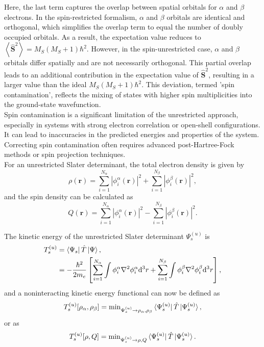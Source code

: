 \documentclass[%
 preprint, linenumbers,
 amsmath,amssymb,
 aps, physrev,
]{revtex4-2}
\begin{document}
Here, the last term captures the overlap between spatial orbitals for $\alpha$ and $\beta$ electrons. In the spin-restricted formalism, $\alpha$ and $\beta$ orbitals are identical and orthogonal, which simplifies the overlap term to equal the number of doubly occupied orbitals. As a result, the expectation value reduces to $\left\langle  \hat{\mathbf{S}}^2 \right\rangle = M_S(M_S+1)\hbar^2$. However, in the spin-unrestricted case, $\alpha$ and $\beta$ orbitals differ spatially and are not necessarily orthogonal. This partial overlap leads to an additional contribution in the expectation value of $\hat{\mathbf{S}}^2$, resulting in a larger value than the ideal $M_S(M_S+1)\hbar^2$. This deviation, termed 'spin contamination', reflects the mixing of states with higher spin multiplicities into the ground-state wavefunction.\\

Spin contamination is a significant limitation of the unrestricted approach, especially in systems with strong electron correlation or open-shell configurations. It can lead to inaccuracies in the predicted energies and properties of the system. Correcting spin contamination often requires advanced post-Hartree-Fock methods or spin projection techniques.\\

For an unrestricted Slater determinant, the total electron density is given by
\begin{equation}
    \rho(\mathbf{r}) = \sum_{i=1}^{N_{\alpha}}|\phi_i^{\alpha}(\mathbf{r})|^2 + \sum_{i=1}^{N_{\beta}}|\phi_i^{\beta}(\mathbf{r})|^2,
\end{equation}
and the spin density can be calculated as
\begin{equation}
    Q(\mathbf{r}) = \sum_{i=1}^{N_{\alpha}}|\phi_i^{\alpha}(\mathbf{r})|^2 - \sum_{i=1}^{N_{\beta}}|\phi_i^{\beta}(\mathbf{r})|^2.
\end{equation}

The kinetic energy of the unrestricted Slater determinant $\Psi_s^{(u)}$ is
\begin{align}
    T_s^{(u)} &= \bra{\Psi_s}\hat{T}\ket{\Psi}, \\
    &= -\frac{\hbar^2}{2m_e}\left[ \sum_{i=1}^{N_{\alpha}}\int\phi_i^{\alpha}\nabla^2\phi_i^{\alpha}\mathrm{d}^3r + \sum_{i=1}^{N_{\beta}}\int\phi_i^{\beta}\nabla^2\phi_i^{\beta}\mathrm{d}^3r \right],
\end{align}
and a noninteracting kinetic energy functional can now be defined as
\begin{equation}
    T_s^{(u)}[\rho_{\alpha},\rho_{\beta}] = \text{min}_{\Psi_s^{(u)}\to \rho_{\alpha},\rho_{\beta}}\bra{\Psi_s^{(u)}}\hat{T}\ket{\Psi_s^{(u)}},
\end{equation}
or as
\begin{equation}
    T_s^{(u)}[\rho, Q] = \text{min}_{\Psi_s^{(u)}\to \rho,Q}\bra{\Psi_s^{(u)}}\hat{T}\ket{\Psi_s^{(u)}}.
\end{equation}
\end{document}
